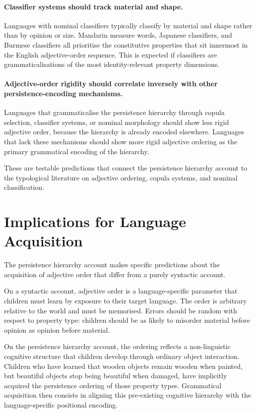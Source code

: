 \documentclass[11pt]{article}
\theoremstyle{rthm}
\theoremstyle{rdef}
\theoremstyle{remark}
\begin{document}
\paragraph{Classifier systems should track material and shape.}
Languages with nominal classifiers typically classify by material and shape
rather than by opinion or size. Mandarin measure words, Japanese classifiers,
and Burmese classifiers all prioritise the constitutive properties that sit
innermost in the English adjective-order sequence. This is expected if
classifiers are grammaticalisations of the most identity-relevant property
dimensions.

\paragraph{Adjective-order rigidity should correlate inversely with other
persistence-encoding mechanisms.}
Languages that grammaticalise the persistence hierarchy through copula
selection, classifier systems, or nominal morphology should show less rigid
adjective order, because the hierarchy is already encoded elsewhere.
Languages that lack these mechanisms should show more rigid adjective
ordering as the primary grammatical encoding of the hierarchy.

These are testable predictions that connect the persistence hierarchy account
to the typological literature on adjective ordering, copula systems, and
nominal classification.

\section{Implications for Language Acquisition}
\label{sec:acquisition}

The persistence hierarchy account makes specific predictions about the
acquisition of adjective order that differ from a purely syntactic account.

On a syntactic account, adjective order is a language-specific parameter
that children must learn by exposure to their target language. The order
is arbitrary relative to the world and must be memorised. Errors should
be random with respect to property type: children should be as likely to
misorder material before opinion as opinion before material.

On the persistence hierarchy account, the ordering reflects a non-linguistic
cognitive structure that children develop through ordinary object interaction.
Children who have learned that wooden objects remain wooden when painted,
but beautiful objects stop being beautiful when damaged, have implicitly
acquired the persistence ordering of those property types. Grammatical
acquisition then consists in aligning this pre-existing cognitive hierarchy
with the language-specific positional encoding.
\end{document}
